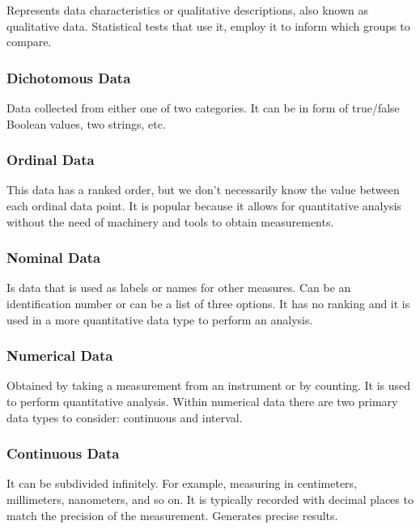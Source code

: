 \documentclass[11pt]{article}
\begin{document}
Represents data characteristics or qualitative descriptions, also known as qualitative data. Statistical tests that use it, employ it to inform which groups to compare.

\subsubsection{Dichotomous Data}
\label{sec:org5a9e146}

Data collected from either one of two categories. It can be in form of true/false Boolean values, two strings, etc.

\subsubsection{Ordinal Data}
\label{sec:org4069e80}

This data has a ranked order, but we don't necessarily know the value between each ordinal data point. It is popular because it allows for quantitative analysis without the need of machinery and tools to obtain measurements.

\subsubsection{Nominal Data}
\label{sec:orge910bbd}

Is data that is used as labels or names for other measures. Can be an identification number or can be a list of three options. It has no ranking and it is used in a more quantitative data type to perform an analysis.

\subsubsection{Numerical Data}
\label{sec:orge564293}

Obtained by taking a measurement from an instrument or by counting. It is used to perform quantitative analysis. Within numerical data there are two primary data types to consider: continuous and interval.

\subsubsection{Continuous Data}
\label{sec:org5e40c9f}

It can be subdivided infinitely. For example, measuring in centimeters, millimeters, nanometers, and so on. It is typically recorded with decimal places to match the precision of the measurement. Generates precise results.
\end{document}

